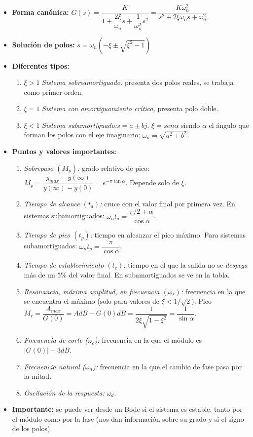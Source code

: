 \documentclass[a4paper, twocolumn, 10pt]{article}
\newlength{\du}
\begin{document}
\begin{itemize}
	\item \textbf{Forma canónica:} $G(s) = \dfrac{K}{1 + \dfrac{2\xi}{\omega_n}s + \dfrac{1}{\omega^2_n}s^2} = \dfrac{K\omega^2_n}{s^2 + 2\xi\omega_ns + \omega^2_n}$
	\item \textbf{Solución de polos:} $s = \omega_n\left(-\xi \pm \sqrt{\xi^2 -1}\right)$
	\item \textbf{Diferentes tipos:}
	\begin{enumerate}
		\item $\xi > 1$ \textit{Sistema sobreamortiguado:} presenta dos polos reales, se trabaja como primer orden.
		\item $\xi = 1$ \textit{Sistema con amortiguamiento crítico,} presenta polo doble.
		\item $\xi < 1$ \textit{Sistema subamortiguado:}$s = a \pm bj$. $\xi = sen\alpha$ siendo $\alpha$ el ángulo que forman los polos con el eje imaginario; $\omega_n = \sqrt{a^2 + b^2}$.
	\end{enumerate}
	\item \textbf{Puntos y valores importantes:}
	\begin{enumerate}
		\item \textit{Sobrepaso $(M_p)$:} grado relativo de pico: $M_p = \dfrac{y_{max}-y(\infty)}{y(\infty)-y(0)} = e^{-\pi\tan\alpha}$. Depende solo de $\xi$.
		\item \textit{Tiempo de alcance $(t_a)$:} cruce con el valor final por primera vez. En sistemas subamortiguados: $\omega_nt_a = \dfrac{\pi/2 +\alpha}{\cos\alpha}$.
		\item \textit{Tiempo de pico $(t_p)$:} tiempo en alcanzar el pico máximo. Para sistemas subamortiguados: $\omega_nt_p = \dfrac{\pi}{\cos\alpha}$.
		\item \textit{Tiempo de establecimiento $(t_e)$:} tiempo en el que la salida no se \textit{despega} más de un $5\%$ del valor final. En subamortiguados se ve en la tabla.
		\item \textit{Resonancia, máxima amplitud, en frecuencia $(\omega_r)$:} frecuencia en la que se encuentra el máximo (solo para valores de $\xi < 1/\sqrt{2}$). Pico $M_r = \dfrac{A_{max}}{G(0)} = AdB - G(0)dB = \dfrac{1}{2\xi\sqrt{1-\xi^2}} = \dfrac{1}{\sin\alpha}$.
		\item \textit{Frecuencia de corte ($\omega_c$):} frecuencia en la que el módulo es $|G(0)| - 3dB$.
		\item \textit{Frecuencia natural ($\omega_n$):} frecuencia en la que el cambio de fase pasa por la mitad.
		\item \textit{Oscilación de la respuesta:} $\omega_d$.
	\end{enumerate}
	\item \textbf{Importante:} se puede ver desde un Bode si el sistema es estable, tanto por el módulo como por la fase (nos dan información sobre su grado y si el signo de los polos).
\end{itemize}
\end{document}
